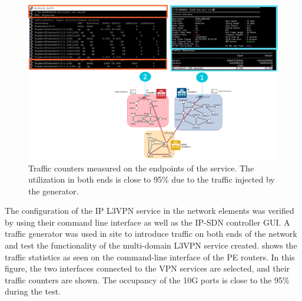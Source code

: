 \documentclass[a4paper,fleqn]{cas-dc}
\begin{document}
\begin{figure}
	\centering
		\includegraphics[width=\linewidth]{figs/counters.png}
	\caption{Traffic counters measured on the endpoints of the service. The utilization in both ends is close to 95\% due to the traffic injected by the generator.}
	\label{FIG:counters}
\end{figure}

The configuration of the IP L3VPN service in the network elements was verified by using their command line interface as well as the IP-SDN controller GUI. A traffic generator was used in site to introduce traffic on both ends of the network and test the functionality of the multi-domain L3VPN service created.  shows the traffic statistics as seen on the command-line interface of the PE routers. In this figure, the two interfaces connected to the VPN services are selected, and their traffic counters are shown. The occupancy of the 10G ports is close to the 95\% during the test. 
\end{document}

